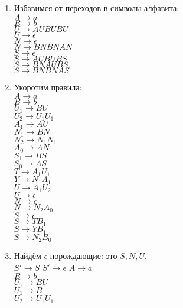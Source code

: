 \documentclass{article}
\begin{document}
    \begin{enumerate}
    \item Избавимся от переходов в символы алфавита:\\
    $ A \to a $\\
    $ B \to b $\\
    $ U \to AUBUBU $\\
    $ U \to \epsilon $\\
    $ N \to \epsilon $\\
    $ N \to BNBNAN $\\
    $ S \to \epsilon $\\
    $ S \to AUBUBS $\\
    $ S \to BNAUBS $\\
    $ S \to BNBNAS $\\
    \item Укоротим правила:\\
    $ A \to a $\\
    $ B \to b $\\
    $ U_1 \to BU$\\
    $ U_2 \to U_1U_1 $\\
    $ A_1 \to AU$\\
    $ N_1 \to BN$\\
    $ N_2 \to N_1N_1$\\
    $ A_0 \to AN$\\
    $ S_1 \to BS$\\
    $ S_0 \to AS$\\
    $ T \to A_1U_1$\\
    $ Y \to N_1A_1$\\
    $ U \to A_1U_2 $\\
    $ U \to \epsilon $\\
    $ N \to \epsilon $\\
    $ N \to N_2A_0 $\\
    $ S \to \epsilon $\\
    $ S \to TB_1 $\\
    $ S \to YB_1 $\\
    $ S \to N_2B_0 $\\
    \item Найдём $\epsilon$-порождающие: это $S, N, U$.\\
    $ S' \to S$
    $ S' \to \epsilon$
    $ A \to a $\\
    $ B \to b $\\
    $ U_1 \to BU$\\
    $ U_1 \to B$\\
    $ U_2 \to U_1U_1 $\\

\end{enumerate}
\end{document}
